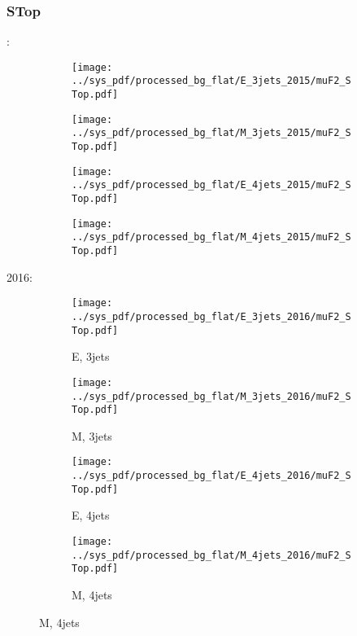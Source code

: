 \documentclass{beamer}
\begin{document}
\begin{frame}
\frametitle{STop}
\fontsize{5}{1}:
\begin{figure}
\centering
\begin{subfigure}[b]{0.24\textwidth}
\texttt{[image: ../sys\_pdf/processed\_bg\_flat/E\_3jets\_2015/muF2\_STop.pdf]}
\end{subfigure}
\begin{subfigure}[b]{0.24\textwidth}
\texttt{[image: ../sys\_pdf/processed\_bg\_flat/M\_3jets\_2015/muF2\_STop.pdf]}
\end{subfigure}
\begin{subfigure}[b]{0.24\textwidth}
\texttt{[image: ../sys\_pdf/processed\_bg\_flat/E\_4jets\_2015/muF2\_STop.pdf]}
\end{subfigure}
\begin{subfigure}[b]{0.24\textwidth}
\texttt{[image: ../sys\_pdf/processed\_bg\_flat/M\_4jets\_2015/muF2\_STop.pdf]}
\end{subfigure}
\end{figure}
2016:
\begin{figure}
\centering
\begin{subfigure}[b]{0.24\textwidth}
\texttt{[image: ../sys\_pdf/processed\_bg\_flat/E\_3jets\_2016/muF2\_STop.pdf]}
\captionsetup{font=tiny}
\caption{E, 3jets}
\end{subfigure}
\begin{subfigure}[b]{0.24\textwidth}
\texttt{[image: ../sys\_pdf/processed\_bg\_flat/M\_3jets\_2016/muF2\_STop.pdf]}
\captionsetup{font=tiny}
\caption{M, 3jets}
\end{subfigure}
\begin{subfigure}[b]{0.24\textwidth}
\texttt{[image: ../sys\_pdf/processed\_bg\_flat/E\_4jets\_2016/muF2\_STop.pdf]}
\captionsetup{font=tiny}
\caption{E, 4jets}
\end{subfigure}
\begin{subfigure}[b]{0.24\textwidth}
\texttt{[image: ../sys\_pdf/processed\_bg\_flat/M\_4jets\_2016/muF2\_STop.pdf]}
\captionsetup{font=tiny}
\caption{M, 4jets}
\end{subfigure}
\end{figure}
\end{frame}
\end{document}
